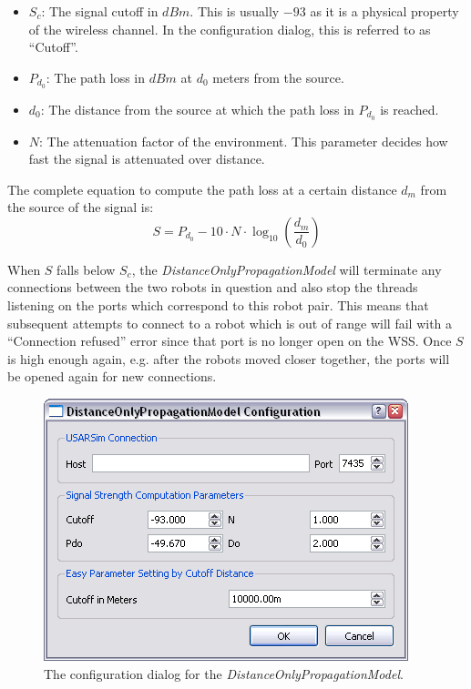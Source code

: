 \documentclass[11pt,a4paper]{article}
\begin{document}
\begin{itemize}
	\item $S_c$: The signal cutoff in $dBm$. This is usually $-93$ as it is a physical property of the wireless channel. In the configuration dialog, this is referred to as ``Cutoff''.
	\item $P_{d_0}$: The path loss in $dBm$ at $d_0$ meters from the source.
	\item $d_0$: The distance from the source at which the path loss in $P_{d_0}$ is reached.
	\item $N$: The attenuation factor of the environment. This parameter decides how fast the signal is attenuated over distance.
\end{itemize}

The complete equation to compute the path loss at a certain distance $d_m$ from the source of the signal is:
\[
	S = P_{d_0} - 10 \cdot N \cdot \log_{10} \left(\frac{d_m}{d_0}\right)
\]

When $S$ falls below $S_c$, the \emph{DistanceOnlyPropagationModel} will terminate any connections between the two robots in question and also stop the threads listening on the ports which correspond to this robot pair. This means that subsequent attempts to connect to a robot which is out of range will fail with a ``Connection refused'' error since that port is no longer open on the WSS. Once $S$ is high enough again, e.g. after the robots moved closer together, the ports will be opened again for new connections.

\begin{figure}[htb]
	\centering
		\includegraphics[width=.8\textwidth]{WSS-DistanceOnlyConfig.png}
	\caption{The configuration dialog for the \emph{DistanceOnlyPropagationModel}.}
	\label{fig:DistanceOnlyPropagationModel-Config}
\end{figure}
\end{document}
